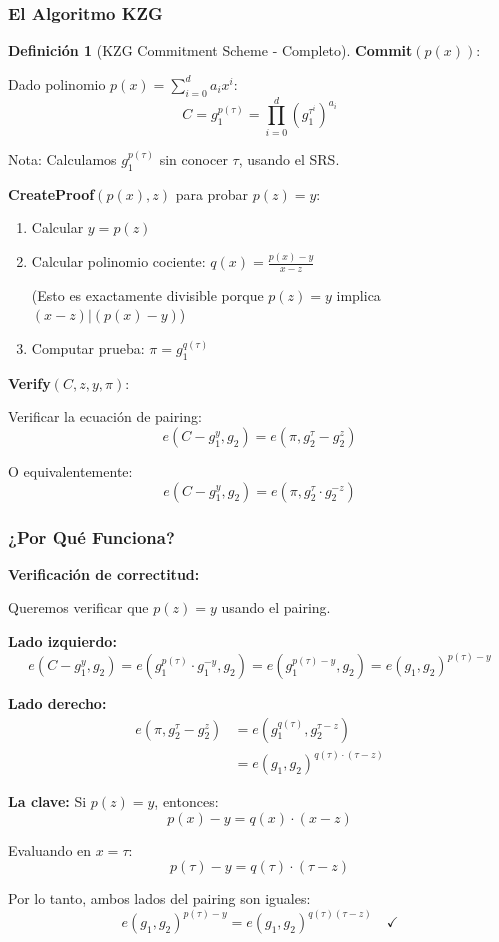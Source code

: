 \documentclass[11pt,a4paper,twoside,openright]{book}
\theoremstyle{definition}
\newtheorem{definition}{Definición}[chapter]
\theoremstyle{plain}
\theoremstyle{remark}
\begin{document}
\subsubsection{El Algoritmo KZG}

\begin{definition}[KZG Commitment Scheme - Completo]
\textbf{Commit}$(p(x))$:

Dado polinomio $p(x) = \sum_{i=0}^d a_i x^i$:
\[ C = g_1^{p(\tau)} = \prod_{i=0}^d (g_1^{\tau^i})^{a_i} \]

Nota: Calculamos $g_1^{p(\tau)}$ sin conocer $\tau$, usando el SRS.

\textbf{CreateProof}$(p(x), z)$ para probar $p(z) = y$:

\begin{enumerate}
    \item Calcular $y = p(z)$
    \item Calcular polinomio cociente: $q(x) = \frac{p(x) - y}{x - z}$
    
    (Esto es exactamente divisible porque $p(z) = y$ implica $(x-z) | (p(x) - y)$)
    
    \item Computar prueba: $\pi = g_1^{q(\tau)}$
\end{enumerate}

\textbf{Verify}$(C, z, y, \pi)$:

Verificar la ecuación de pairing:
\[ e(C - g_1^y, g_2) = e(\pi, g_2^\tau - g_2^z) \]

O equivalentemente:
\[ e(C - g_1^y, g_2) = e(\pi, g_2^\tau \cdot g_2^{-z}) \]
\end{definition}

\subsubsection{¿Por Qué Funciona?}

\begin{mathnote}
\textbf{Verificación de correctitud:}

Queremos verificar que $p(z) = y$ usando el pairing.

\textbf{Lado izquierdo:}
\[ e(C - g_1^y, g_2) = e(g_1^{p(\tau)} \cdot g_1^{-y}, g_2) = e(g_1^{p(\tau) - y}, g_2) = e(g_1, g_2)^{p(\tau) - y} \]

\textbf{Lado derecho:}
\begin{align}
e(\pi, g_2^\tau - g_2^z) &= e(g_1^{q(\tau)}, g_2^{\tau - z}) \\
                         &= e(g_1, g_2)^{q(\tau) \cdot (\tau - z)}
\end{align}

\textbf{La clave:} Si $p(z) = y$, entonces:
\[ p(x) - y = q(x) \cdot (x - z) \]

Evaluando en $x = \tau$:
\[ p(\tau) - y = q(\tau) \cdot (\tau - z) \]

Por lo tanto, ambos lados del pairing son iguales:
\[ e(g_1, g_2)^{p(\tau) - y} = e(g_1, g_2)^{q(\tau)(\tau - z)} \quad \checkmark \]
\end{mathnote}
\end{document}
